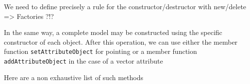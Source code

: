 \begin{ndr}
We need to define precisely a rule for the constructor/destructor with new/delete => Factories ?!?
\end{ndr}
In the same way,  a complete model may be constructed using the specific constructor of each object. After this operation, we can use either the member function \texttt{setAttributeObject} for pointing or  a member function  \texttt{addAttributeObject} in the case of a vector attribute

 Here are a non exhaustive list of such methods

